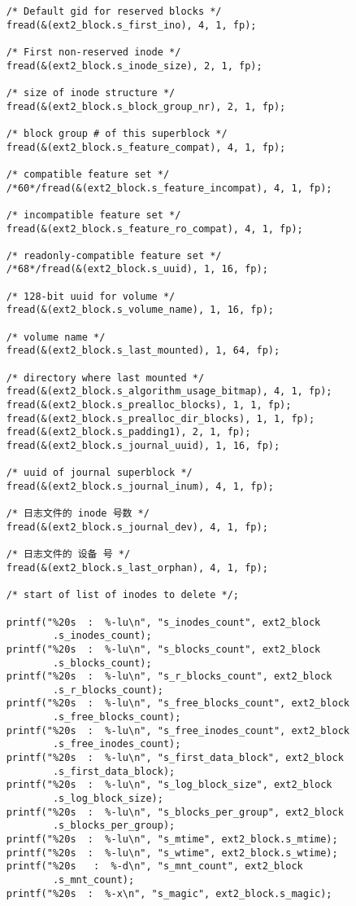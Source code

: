 \documentclass[UTF8]{ctexart}
\begin{document}
\begin{verbatim}
    /* Default gid for reserved blocks */
    fread(&(ext2_block.s_first_ino), 4, 1, fp);

    /* First non-reserved inode */
    fread(&(ext2_block.s_inode_size), 2, 1, fp);

    /* size of inode structure */
    fread(&(ext2_block.s_block_group_nr), 2, 1, fp);

    /* block group # of this superblock */
    fread(&(ext2_block.s_feature_compat), 4, 1, fp);

    /* compatible feature set */
    /*60*/fread(&(ext2_block.s_feature_incompat), 4, 1, fp);

    /* incompatible feature set */
    fread(&(ext2_block.s_feature_ro_compat), 4, 1, fp);

    /* readonly-compatible feature set */
    /*68*/fread(&(ext2_block.s_uuid), 1, 16, fp);

    /* 128-bit uuid for volume */
    fread(&(ext2_block.s_volume_name), 1, 16, fp);

    /* volume name */
    fread(&(ext2_block.s_last_mounted), 1, 64, fp);

    /* directory where last mounted */
    fread(&(ext2_block.s_algorithm_usage_bitmap), 4, 1, fp);
    fread(&(ext2_block.s_prealloc_blocks), 1, 1, fp);
    fread(&(ext2_block.s_prealloc_dir_blocks), 1, 1, fp);
    fread(&(ext2_block.s_padding1), 2, 1, fp);
    fread(&(ext2_block.s_journal_uuid), 1, 16, fp);

    /* uuid of journal superblock */
    fread(&(ext2_block.s_journal_inum), 4, 1, fp);

    /* 日志文件的 inode 号数 */
    fread(&(ext2_block.s_journal_dev), 4, 1, fp);

    /* 日志文件的 设备 号 */
    fread(&(ext2_block.s_last_orphan), 4, 1, fp);

    /* start of list of inodes to delete */;

    printf("%20s  :  %-lu\n", "s_inodes_count", ext2_block
            .s_inodes_count);
    printf("%20s  :  %-lu\n", "s_blocks_count", ext2_block
            .s_blocks_count);
    printf("%20s  :  %-lu\n", "s_r_blocks_count", ext2_block
            .s_r_blocks_count);
    printf("%20s  :  %-lu\n", "s_free_blocks_count", ext2_block
            .s_free_blocks_count);
    printf("%20s  :  %-lu\n", "s_free_inodes_count", ext2_block
            .s_free_inodes_count);
    printf("%20s  :  %-lu\n", "s_first_data_block", ext2_block
            .s_first_data_block);
    printf("%20s  :  %-lu\n", "s_log_block_size", ext2_block
            .s_log_block_size);
    printf("%20s  :  %-lu\n", "s_blocks_per_group", ext2_block
            .s_blocks_per_group);
    printf("%20s  :  %-lu\n", "s_mtime", ext2_block.s_mtime);
    printf("%20s  :  %-lu\n", "s_wtime", ext2_block.s_wtime);
    printf("%20s   :  %-d\n", "s_mnt_count", ext2_block
            .s_mnt_count);
    printf("%20s  :  %-x\n", "s_magic", ext2_block.s_magic);


\end{verbatim}
\end{document}
